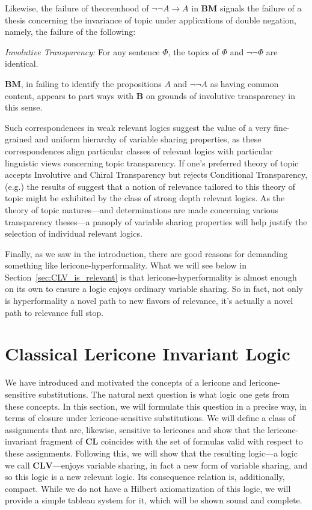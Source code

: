 \documentclass{amsart}
\theoremstyle{definition}
\newcommand{\CLV}{\mathbf{CLV}}
\newcommand{\logic}[1]{{\ensuremath {\mathbf{#1}}}}
\begin{document}
Likewise, the failure of theoremhood of $\neg\neg A\rightarrow A$ in $\mathbf{BM}$ signals the failure of a thesis concerning the invariance of topic under applications of double negation, namely, the failure of the following:

\vspace{.2cm}

\noindent\emph{Involutive Transparency:} For any sentence $\Phi$, the topics of $\Phi$ and $\neg\neg\Phi$ are identical.

\vspace{.2cm}

\noindent $\mathbf{BM}$, in failing to identify the propositions $A$ and $\neg\neg A$ as having common content, appears to part ways with $\mathbf{B}$ on grounds of involutive transparency in this sense.

Such correspondences in weak relevant logics suggest the value of a very fine-grained and uniform hierarchy of variable sharing properties, as these correspondences align particular classes of relevant logics with particular linguistic views concerning topic transparency. If one's preferred theory of topic accepts Involutive and Chiral Transparency but rejects Conditional Transparency, (e.g.) the results of \cite{logan2021} suggest that a notion of relevance tailored to this theory of topic might be exhibited by the class of strong depth relevant logics. As the theory of topic matures---and determinations are made concerning various transparency theses---a panoply of variable sharing properties will help justify the selection of individual relevant logics.


Finally, as we saw in the introduction, there are good reasons for demanding something like lericone-hyperformality. What we will see below in Section~\ref{sec:CLV_is_relevant} is that lericone-hyperformality is almost enough on its own to ensure a logic enjoys ordinary variable sharing. So in fact, not only is hyperformality a novel path to new flavors of relevance, it's actually a novel path to relevance full stop.

\section{Classical Lericone Invariant Logic}\label{Section:CLV}

We have introduced and motivated the concepts of a lericone and lericone-sensitive substitutions. The natural next question is what logic one gets from these concepts. In this section, we will formulate this question in a precise way, in terms of closure under lericone-sensitive substitutions. We will define a class of assignments that are, likewise, sensitive to lericones and show that the lericone-invariant fragment of \logic{CL} coincides with the set of formulas valid with respect to these assignments. Following this, we will show that the resulting logic---a logic we call $\CLV$---enjoys variable sharing, in fact a new form of variable sharing, and so this logic is a new relevant logic. Its consequence relation is, additionally, compact. While we do not have a Hilbert axiomatization of this logic, we will provide a simple tableau system for it, which will be shown sound and complete. 
\end{document}
